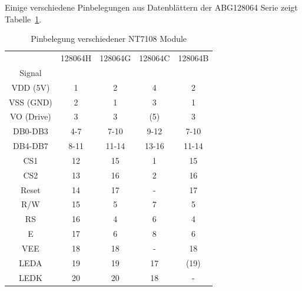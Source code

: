Einige verschiedene Pinbelegungen aus Datenblättern der ABG128064 Serie zeigt Tabelle~\ref{tab:NT7108types}.

\begin{table}[H]
  \begin{center}
    \begin{tabular}{| c || c | c | c | c |}
    \hline
           & 128064H  &  128064G  & 128064C  & 128064B \\
    Signal &         &          &         &         \\
    \hline
    \hline
  VDD (5V) &   1     &  2       &   4     & 2       \\
    \hline
  VSS (GND) &   2     &  1       &   3     & 1       \\
    \hline
 VO (Drive) &   3     &  3       &  (5)    & 3       \\
    \hline
  DB0-DB3   &   4-7   &  7-10    &   9-12  & 7-10    \\
    \hline
  DB4-DB7   &   8-11  &  11-14   &   13-16 & 11-14   \\
    \hline
  CS1       &   12    &  15      &   1     & 15      \\
  CS2       &   13    &  16      &   2     & 16      \\
    \hline
  Reset     &   14    &  17      &   -     & 17      \\
    \hline
  R/W       &   15    &  5       &   7     & 5       \\
    \hline
  RS        &   16    &  4       &   6     & 4       \\
    \hline
  E         &   17    &  6       &   8     & 6       \\
    \hline
  VEE       &   18    &  18      &   -     & 18      \\
    \hline
  LEDA      &   19    &  19      &   17    & (19)      \\
  LEDK      &   20    &  20      &   18    & -      \\
    \hline
    \end{tabular}
  \end{center}
  \caption{Pinbelegung verschiedener NT7108 Module}
\label{tab:NT7108types}
\end{table}

